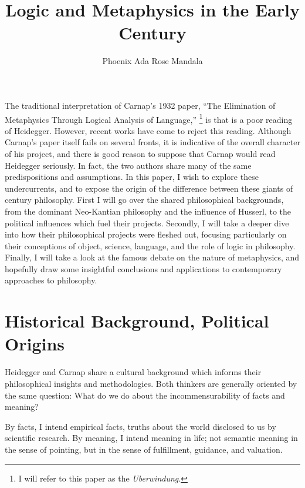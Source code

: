 \documentclass[leqno, 12pt]{turabian-researchpaper}
\title{Logic and Metaphysics in the Early \nth{20} Century}
\author{Phoenix Ada Rose Mandala}
\begin{document}
	\maketitle

	The traditional interpretation of Carnap's 1932 paper, \enquote{The Elimination of Metaphysics Through Logical Analysis of Language,}
	\nocite{carnap1966}\footnote{I will refer to this paper as the \textit{Uberwindung}.}
	is that is a poor reading of Heidegger. However, recent works have come to
	reject this reading. Although Carnap's paper itself fails on several fronts,
	it is indicative of the overall character of his project, and there is good reason
	to suppose that Carnap would read Heidegger seriously. In fact, the two authors
	share many of the same predispositions and assumptions. In this paper, I wish to
	explore these undercurrents, and to expose the origin of the difference
	between these giants of  century philosophy. First I will go over the
	shared philosophical backgrounds, from the dominant Neo-Kantian philosophy and
	the influence of Husserl, to the political influences which fuel their
	projects. Secondly, I will take a deeper dive into how their philosophical
	projects were fleshed out, focusing particularly on their conceptions of object,
	science, language, and the role of logic in philosophy. Finally, I will take a
	look at the famous debate on the nature of metaphysics, and hopefully draw some
	insightful conclusions and applications to contemporary approaches to philosophy.

	\section{Historical Background, Political Origins}

	Heidegger and Carnap share a cultural background which informs their
	philosophical insights and methodologies. Both thinkers are generally oriented
	by the same question: What do we do about the incommensurability of facts and
	meaning?

	By facts, I intend empirical facts, truths about the world disclosed to us by
	scientific research. By meaning, I intend meaning in life; not semantic meaning
	in the sense of pointing, but in the sense of fulfillment, guidance, and
	valuation.
\end{document}

